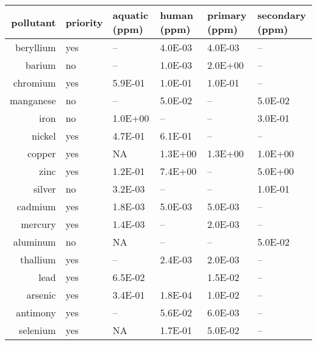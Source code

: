 \begin{tabular}{| r | l | l | l | l | l |}
	\hline %
	pollutant & priority & aquatic (ppm) & human (ppm) & primary (ppm) & secondary (ppm) \\
	\hline %
	beryllium & yes      & --            & 4.0E-03     & 4.0E-03       & --              \\
	barium    & no       & --            & 1.0E-03     & 2.0E+00       & --              \\
	chromium  & yes      & 5.9E-01       & 1.0E-01     & 1.0E-01       & --              \\
	manganese & no       & --            & 5.0E-02     & --            & 5.0E-02         \\
	iron      & no       & 1.0E+00       & --          & --            & 3.0E-01         \\
	nickel    & yes      & 4.7E-01       & 6.1E-01     & --            & --              \\
	copper    & yes      & NA            & 1.3E+00     & 1.3E+00       & 1.0E+00         \\
	zinc      & yes      & 1.2E-01       & 7.4E+00     & --            & 5.0E+00         \\
	silver    & no       & 3.2E-03       & --          & --            & 1.0E-01         \\
	cadmium   & yes      & 1.8E-03       & 5.0E-03     & 5.0E-03       & --              \\
	mercury   & yes      & 1.4E-03       & --          & 2.0E-03       & --              \\
	aluminum  & no       & NA            & --          & --            & 5.0E-02         \\
	thallium  & yes      & --            & 2.4E-03     & 2.0E-03       & --              \\
	lead      & yes      & 6.5E-02       &             & 1.5E-02       & --              \\
	arsenic   & yes      & 3.4E-01       & 1.8E-04     & 1.0E-02       & --              \\
	antimony  & yes      & --            & 5.6E-02     & 6.0E-03       & --              \\
	selenium  & yes      & NA            & 1.7E-01     & 5.0E-02       & --           	 \\
	\hline %
\end{tabular}

